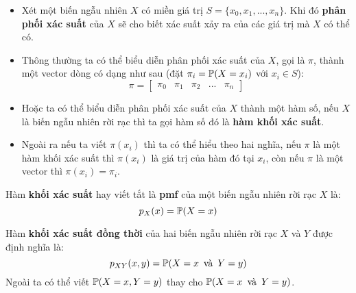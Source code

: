\begin{itemize}
    \item Xét một biến ngẫu nhiên $X$ có miền giá trị $S = \{x_0, x_1, ..., x_n\}$. Khi đó \textbf{phân phối xác suất} của $X$ sẽ cho biết xác suất xảy ra của các giá trị mà $X$ có thể có.

    \item Thông thường ta có thể biểu diễn phân phối xác suất của $X$, gọi là $\pi$, thành một vector dòng có dạng như sau (đặt $\pi_i = \P(X = x_i)$ với $x_i \in S$):
    $$
    \pi = \begin{bmatrix}
        \pi_0 & \pi_1 & \pi_2 & ... & \pi_n
    \end{bmatrix}
    $$

    \item Hoặc ta có thể biểu diễn phân phối xác suất của $X$ thành một hàm số, nếu $X$ là biến ngẫu nhiên rời rạc thì ta gọi hàm số đó là \textbf{hàm khối xác suất}.

    \item Ngoài ra nếu ta viết $\pi(x_i)$ thì ta có thể hiểu theo hai nghĩa, nếu $\pi$ là một hàm khối xác suất thì $\pi(x_i)$ là giá trị của hàm đó tại $x_i$, còn nếu $\pi$ là một vector thì $\pi(x_i) = \pi_i$.
\end{itemize}

\begin{defivn}
    Hàm \textbf{khối xác suất} hay viết tắt là \textbf{pmf} của một biến ngẫu nhiên rời rạc $X$ là:
    $$
    p_X(x) = \P(X = x)
    $$
\end{defivn}

\begin{defivn}
    Hàm \textbf{khối xác suất đồng thời} của hai biến ngẫu nhiên rời rạc $X$ và $Y$ được định nghĩa là:
    $$
    p_{XY}(x, y) = \P(X = x \hspace*{5pt} \text{và} \hspace*{5pt} Y = y)
    $$
    Ngoài ta có thể viết $\P(X=x, Y=y)$ thay cho $\P(X = x \hspace*{5pt} \text{và} \hspace*{5pt} Y = y)$.
\end{defivn}


